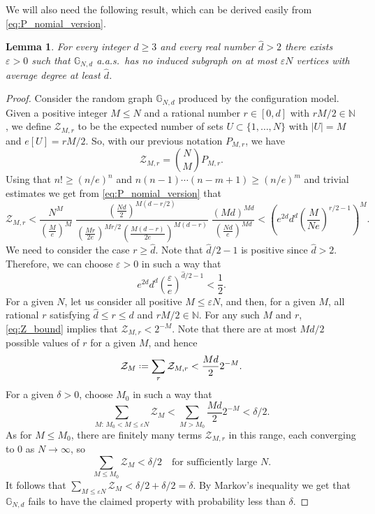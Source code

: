 \documentclass[12pt]{amsart}
\newtheorem{lemma}[theorem]{Lemma}
\theoremstyle{definition}
\newcommand\Nb{\mathbb{N}}
\newcommand\Gb{\mathbb{G}}
\newcommand\Zc{\mathcal{Z}}
\newcommand\dhat{\hat{d}}
\newcommand\de{\delta}
\newcommand\eps{\varepsilon}
\newcommand{\defeq}{\mathrel{\vcenter{\baselineskip0.5ex \lineskiplimit0pt
                     \hbox{\scriptsize.}\hbox{\scriptsize.}}}%
                     =}
\begin{document}
%
We will also need the following result, which can be derived easily from \eqref{eq:P_nomial_version}.
%
\begin{lemma} \label{lem:av_deg_2}
For every integer $d \geq 3$ and every real number $\dhat > 2$ there exists $\eps>0$ such that $\Gb_{N,d}$ a.a.s.~has no induced subgraph on at most $\eps N$ vertices with average degree at least $\dhat$.
\end{lemma}
%
\begin{proof}
Consider the random graph $\Gb_{N,d}$ produced by the configuration model. Given a positive integer $M \leq N$ and a rational number $r \in [0,d]$ with $rM/2 \in \Nb$, we define $\Zc_{M,r}$ to be the expected number of sets $U \subset \{1,\ldots,N\}$ with $|U|=M$ and $e[U]=r M/2$. So, with our previous notation $P_{M,r}$, we have  
%
\[ \Zc_{M,r} = \binom{N}{M} P_{M,r} .\]
%
Using that $n! \geq (n/e)^n$ and $n(n-1) \cdots (n-m+1) \geq (n/e)^m$ and trivial estimates we get from \eqref{eq:P_nomial_version} that 
%
\begin{equation} \label{eq:Z_bound}
\Zc_{M,r} <
\frac{N^M}{\left(\frac{M}{e}\right)^M} \;
\frac{\left(\frac{Nd}{2}\right)^{M(d-r/2)} }{\left( \frac{Mr}{2e} \right)^{Mr/2} \left( \frac{M(d-r)}{2e} \right)^{M(d-r)} } \;
\frac{(Md)^{Md}}{\left(\frac{Nd}{e}\right)^{Md}} 
< \left( e^{2d} d^d \left( \frac{M}{Ne} \right)^{r/2-1} \right)^M .
\end{equation}
%
We need to consider the case $r \geq \dhat$. Note that $\dhat/2-1$ is positive since $\dhat>2$. Therefore, we can choose $\eps>0$ in such a way that 
%
\[ e^{2d} d^d \left( \frac{\eps}{e} \right)^{\dhat/2-1} 
< \frac{1}{2} .\]
%
For a given $N$, let us consider all positive $M \leq \eps N$, and then, for a given $M$, all rational $r$ satisfying $\dhat \leq r \leq d$ and $rM/2 \in \Nb$. For any such $M$ and $r$, \eqref{eq:Z_bound} implies that $\Zc_{M,r} < 2^{-M}$. Note that there are at most $Md/2$ possible values of $r$ for a given $M$, and hence 
%
\[ \Zc_{M} \defeq \sum_r \Zc_{M,r} < \frac{Md}{2} 2^{-M} .\] 
%
For a given $\delta>0$, choose $M_0$ in such a way that 
%
\[ \sum_{M: \, M_0 < M \leq \eps N} \Zc_{M} < 
\sum_{M > M_0} \frac{Md}{2} 2^{-M} < \de/2.\]
%
As for $M \leq M_0$, there are finitely many terms $\Zc_{M,r}$ in this range, each converging to $0$ as $N \to \infty$, so 
%
\[ \sum_{M \leq M_0} \Zc_{M} < \de/2 \quad 
\text{for sufficiently large $N$.} \]
%
It follows that $\sum_{M \leq \eps N} \Zc_M <\de/2 + \de/2 = \de$. By Markov's inequality we get that $\Gb_{N,d}$ fails to have the claimed property with probability less than $\de$.
\end{proof}
%
\end{document}
